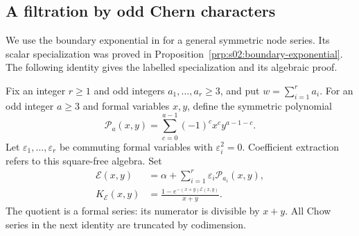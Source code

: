 \subsection{A filtration by odd Chern characters}
\label{subsec:s05:01}

We use the boundary exponential in
\cite[Lemma~3.10, (3.18)--(3.21)]{ABCDGLW23} for a general symmetric
node series. Its scalar specialization was proved in
Proposition~\ref{prp:s02:boundary-exponential}. The following identity
gives the labelled specialization and its algebraic proof.

Fix an integer $r\geq1$ and odd integers $a_1,\ldots,a_r\geq3$,
and put $w=\sum_{i=1}^r a_i$. For an odd integer $a\geq3$ and formal variables $x,y$, define
the symmetric polynomial
\begin{equation}\label{eq:s05:node-polynomial}
 \mathcal P_a(x,y)=\sum_{c=0}^{a-1}(-1)^c x^c y^{a-1-c}.
\end{equation}
Let $\varepsilon_1,\ldots,\varepsilon_r$ be commuting formal
variables with $\varepsilon_i^2=0$. Coefficient extraction refers to
this square-free algebra. Set
\begin{equation}\label{eq:s05:source-kernel}
\begin{split}
 \mathcal E(x,y)&=\alpha+
       \sum_{i=1}^r\varepsilon_i\mathcal P_{a_i}(x,y),\\
 K_{\mathcal E}(x,y)&=
       \frac{1-e^{-(x+y)\mathcal E(x,y)}}{x+y}.
\end{split}
\end{equation}
The quotient is a formal series: its numerator is divisible by $x+y$.
All Chow series in the next identity are truncated by codimension.

